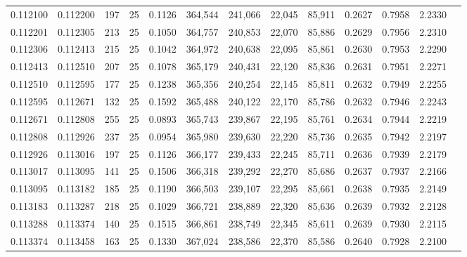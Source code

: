 \begin{tabular}{rrrrrrrrrrrrr}
0.112100 & 0.112200 &   197 &  25 &                                     0.1126 & 364,544 & 241,066 &  22,045 &  85,911 & 0.2627 & 0.7958 & 2.2330 \\
0.112201 & 0.112305 &   213 &  25 &                                     0.1050 & 364,757 & 240,853 &  22,070 &  85,886 & 0.2629 & 0.7956 & 2.2310 \\
0.112306 & 0.112413 &   215 &  25 &                                     0.1042 & 364,972 & 240,638 &  22,095 &  85,861 & 0.2630 & 0.7953 & 2.2290 \\
0.112413 & 0.112510 &   207 &  25 &                                     0.1078 & 365,179 & 240,431 &  22,120 &  85,836 & 0.2631 & 0.7951 & 2.2271 \\
0.112510 & 0.112595 &   177 &  25 &                                     0.1238 & 365,356 & 240,254 &  22,145 &  85,811 & 0.2632 & 0.7949 & 2.2255 \\
0.112595 & 0.112671 &   132 &  25 &                                     0.1592 & 365,488 & 240,122 &  22,170 &  85,786 & 0.2632 & 0.7946 & 2.2243 \\
0.112671 & 0.112808 &   255 &  25 &                                     0.0893 & 365,743 & 239,867 &  22,195 &  85,761 & 0.2634 & 0.7944 & 2.2219 \\
0.112808 & 0.112926 &   237 &  25 &                                     0.0954 & 365,980 & 239,630 &  22,220 &  85,736 & 0.2635 & 0.7942 & 2.2197 \\
0.112926 & 0.113016 &   197 &  25 &                                     0.1126 & 366,177 & 239,433 &  22,245 &  85,711 & 0.2636 & 0.7939 & 2.2179 \\
0.113017 & 0.113095 &   141 &  25 &                                     0.1506 & 366,318 & 239,292 &  22,270 &  85,686 & 0.2637 & 0.7937 & 2.2166 \\
0.113095 & 0.113182 &   185 &  25 &                                     0.1190 & 366,503 & 239,107 &  22,295 &  85,661 & 0.2638 & 0.7935 & 2.2149 \\
0.113183 & 0.113287 &   218 &  25 &                                     0.1029 & 366,721 & 238,889 &  22,320 &  85,636 & 0.2639 & 0.7932 & 2.2128 \\
0.113288 & 0.113374 &   140 &  25 &                                     0.1515 & 366,861 & 238,749 &  22,345 &  85,611 & 0.2639 & 0.7930 & 2.2115 \\
0.113374 & 0.113458 &   163 &  25 &                                     0.1330 & 367,024 & 238,586 &  22,370 &  85,586 & 0.2640 & 0.7928 & 2.2100 \\

\end{tabular}

